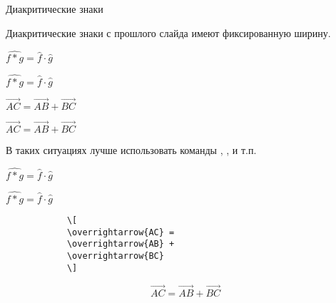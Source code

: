 \begin{frame}[fragile]{Диакритические знаки}
	\large
	
	Диакритические знаки с прошлого слайда имеют фиксированную ширину.
	
	\begin{minipage}{0.59\textwidth}
		\texttt{$\hat{f*g}=\hat f\cdot\hat g$}
	\end{minipage}
	\begin{minipage}{0.39\textwidth}
		\begin{center}
			$\hat{f*g}=\hat f\cdot\hat g$
		\end{center}
	\end{minipage}
	
	\begin{minipage}{0.59\textwidth}
		\texttt{$\vec{AC} = \vec{AB} + \vec{BC}$}
	\end{minipage}
	\begin{minipage}{0.39\textwidth}
		\begin{center}
			$\vec{AC} = \vec{AB} + \vec{BC}$
		\end{center}
	\end{minipage}

	В таких ситуациях лучше использовать команды \texttt{\widehat}, \texttt{\overline}, \texttt{\overrightarrow}  и т.п.

	\begin{minipage}{0.59\textwidth}
		\texttt{$\widehat{f*g}=\hat f\cdot\hat g$}
	\end{minipage}
	\begin{minipage}{0.39\textwidth}
		\begin{center}
			$\widehat{f*g}=\hat f\cdot\hat g$
		\end{center}
	\end{minipage}

	\begin{minipage}{0.59\textwidth}
		\begin{verbatim}
			\[
			\overrightarrow{AC} = 
			\overrightarrow{AB} + 
			\overrightarrow{BC}
			\]
		\end{verbatim}
	\end{minipage}
	\begin{minipage}{0.39\textwidth}
		\begin{center}
			\[
			\overrightarrow{AC} = 
			\overrightarrow{AB} + 
			\overrightarrow{BC}
			\]
		\end{center}
	\end{minipage}	
\end{frame}


